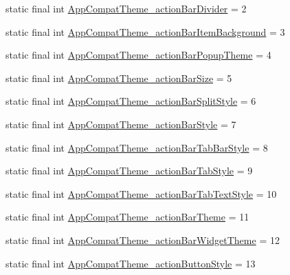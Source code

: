 \begin{DoxyCompactItemize}
static final int \mbox{\hyperlink{classcom_1_1synnapps_1_1carouselview_1_1_r_1_1styleable_a2d7a1490b540c76470da18fcbadf9c49}{App\+Compat\+Theme\+\_\+action\+Bar\+Divider}} = 2
\item 
static final int \mbox{\hyperlink{classcom_1_1synnapps_1_1carouselview_1_1_r_1_1styleable_a9fe6296941acbb3115a5094ab04a9039}{App\+Compat\+Theme\+\_\+action\+Bar\+Item\+Background}} = 3
\item 
static final int \mbox{\hyperlink{classcom_1_1synnapps_1_1carouselview_1_1_r_1_1styleable_ab6c3a56bdbde5eee14c2b3a96784fe14}{App\+Compat\+Theme\+\_\+action\+Bar\+Popup\+Theme}} = 4
\item 
static final int \mbox{\hyperlink{classcom_1_1synnapps_1_1carouselview_1_1_r_1_1styleable_a0419f655d3fa4b92852c7df89139d549}{App\+Compat\+Theme\+\_\+action\+Bar\+Size}} = 5
\item 
static final int \mbox{\hyperlink{classcom_1_1synnapps_1_1carouselview_1_1_r_1_1styleable_a309c3bcf65b3e3a7d9bb3d7e154adb77}{App\+Compat\+Theme\+\_\+action\+Bar\+Split\+Style}} = 6
\item 
static final int \mbox{\hyperlink{classcom_1_1synnapps_1_1carouselview_1_1_r_1_1styleable_acb9475951d11b916dafb4c1e8524d9e3}{App\+Compat\+Theme\+\_\+action\+Bar\+Style}} = 7
\item 
static final int \mbox{\hyperlink{classcom_1_1synnapps_1_1carouselview_1_1_r_1_1styleable_a4e1c7c4902f3d7c745c27ff7014b5909}{App\+Compat\+Theme\+\_\+action\+Bar\+Tab\+Bar\+Style}} = 8
\item 
static final int \mbox{\hyperlink{classcom_1_1synnapps_1_1carouselview_1_1_r_1_1styleable_a8aa8948db5163fd3654ed87d6b20b134}{App\+Compat\+Theme\+\_\+action\+Bar\+Tab\+Style}} = 9
\item 
static final int \mbox{\hyperlink{classcom_1_1synnapps_1_1carouselview_1_1_r_1_1styleable_a6d254c7df9410bb9071b3a74d46c5b58}{App\+Compat\+Theme\+\_\+action\+Bar\+Tab\+Text\+Style}} = 10
\item 
static final int \mbox{\hyperlink{classcom_1_1synnapps_1_1carouselview_1_1_r_1_1styleable_a25f9a23fed54725ae796d7e3ed8c80fe}{App\+Compat\+Theme\+\_\+action\+Bar\+Theme}} = 11
\item 
static final int \mbox{\hyperlink{classcom_1_1synnapps_1_1carouselview_1_1_r_1_1styleable_aa5f0e4c688a9e4022034b8cec44c2a2a}{App\+Compat\+Theme\+\_\+action\+Bar\+Widget\+Theme}} = 12
\item 
static final int \mbox{\hyperlink{classcom_1_1synnapps_1_1carouselview_1_1_r_1_1styleable_a79503741d38348a68c6385b736d9ac91}{App\+Compat\+Theme\+\_\+action\+Button\+Style}} = 13

\end{DoxyCompactItemize}
